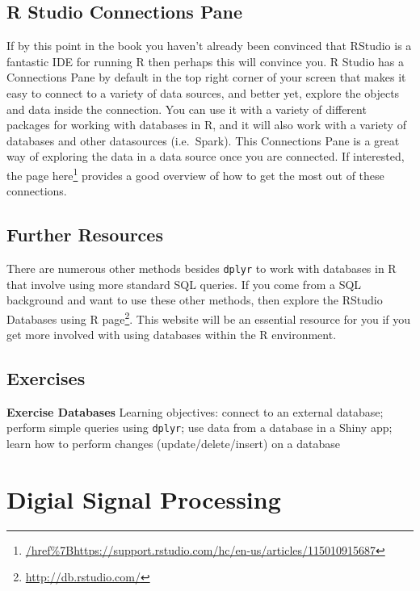 \documentclass[]{krantz}
\renewcommand{\href}[2]{#2\footnote{\url{#1}}}
\begin{document}
\section{R Studio Connections Pane}\label{r-studio-connections-pane}

If by this point in the book you haven't already been convinced that
RStudio is a fantastic IDE for running R then perhaps this will convince
you. R Studio has a Connections Pane by default in the top right corner
of your screen that makes it easy to connect to a variety of data
sources, and better yet, explore the objects and data inside the
connection. You can use it with a variety of different packages for
working with databases in R, and it will also work with a variety of
databases and other datasources (i.e.~Spark). This Connections Pane is a
great way of exploring the data in a data source once you are connected.
If interested, the page
\href{/href\%7Bhttps://support.rstudio.com/hc/en-us/articles/115010915687}{here}
provides a good overview of how to get the most out of these
connections.

\section{Further Resources}\label{further-resources}

There are numerous other methods besides \texttt{dplyr} to work with
databases in R that involve using more standard SQL queries. If you come
from a SQL background and want to use these other methods, then explore
the \href{http://db.rstudio.com/}{RStudio Databases using R page}. This
website will be an essential resource for you if you get more involved
with using databases within the R environment.

\section{Exercises}\label{exercises-10}

\textbf{Exercise Databases} Learning objectives: connect to an external
database; perform simple queries using \texttt{dplyr}; use data from a
database in a Shiny app; learn how to perform changes
(update/delete/insert) on a database

\chapter{Digial Signal Processing}\label{digial-signal-processing}
\end{document}
